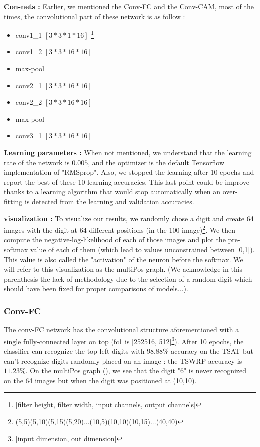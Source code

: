 			\textbf{Con-nets :}
			Earlier, we mentioned the Conv-FC and the Conv-CAM, most of the times, the convolutional part of these network is as follow :
			\begin{itemize}
				\setlength\itemsep{-0.4em}
				\item conv1\_1 $[3*3*1*16]$ \footnote{[filter height, filter width, input channels, output channels]}
				\item conv1\_2 $[3*3*16*16]$
				\item max-pool
				\item conv2\_1 $[3*3*16*16]$
				\item conv2\_2 $[3*3*16*16]$
				\item max-pool
				\item conv3\_1 $[3*3*16*16]$
			\end{itemize}

			\textbf{Learning parameters :} When not mentioned, we understand that the learning rate of the network is $0.005$, and the optimizer is the default Tensorflow implementation of "RMSprop". Also, we stopped the learning after 10 epochs and report the best of these 10 learning accuracies. This last point could be improve thanks to a learning algorithm that would stop automatically when an over-fitting is detected from the learning and validation accuracies.

			\textbf{visualization :} To visualize our results, we randomly chose a digit and create 64 images with the digit at 64 different positions (in the 100 image)\footnote{(5,5)(5,10)(5,15)(5,20)...(10,5)(10,10)(10,15)...(40,40)}. We then compute the negative-log-likelihood of each of those images and plot the pre-softmax value of each of them (which lead to values unconstrained between [0,1]). This value is also called the "activation" of the neuron before the softmax. We will refer to this visualization as the multiPos graph. (We acknowledge in this parenthesis the lack of methodology due to the selection of a random digit which should have been fixed for proper comparisons of models...).

			\subsubsection{Conv-FC} 
			\label{ssub:conv_fc}
				The conv-FC network has the convolutional structure aforementioned with a single fully-connected layer on top (fc1 is [252516, 512]\footnote{[input dimension, out dimension]}).
				After 10 epochs, the classifier can recognize the top left digits with $98.88\%$ accuracy on the TSAT but can't recognize digits randomly placed on an image : the TSWRP accuracy is $11.23\%$. On the multiPos graph (), we see that the digit "6" is never recognized on the 64 images but when the digit was positioned at (10,10).

